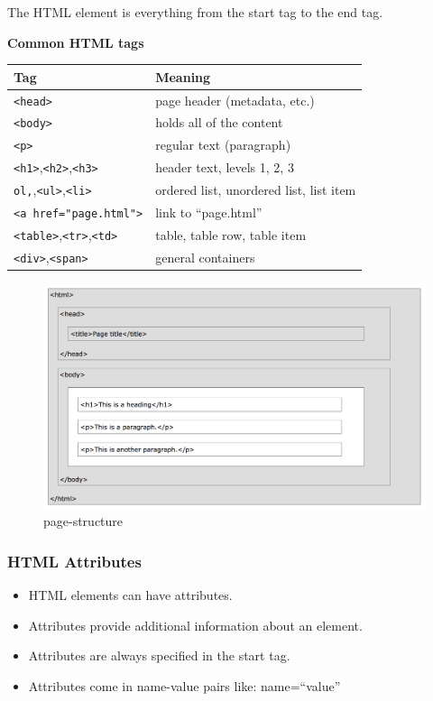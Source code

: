 \documentclass[]{book}
\providecommand{\tightlist}{%
  \setlength{\itemsep}{0pt}\setlength{\parskip}{0pt}}
\begin{document}
The HTML element is everything from the start tag to the end tag.

\textbf{Common HTML tags}

\begin{longtable}[]{@{}ll@{}}
\toprule
Tag & Meaning\tabularnewline
\midrule
\endhead
\texttt{\textless{}head\textgreater{}} & page header (metadata,
etc.)\tabularnewline
\texttt{\textless{}body\textgreater{}} & holds all of the
content\tabularnewline
\texttt{\textless{}p\textgreater{}} & regular text
(paragraph)\tabularnewline
\texttt{\textless{}h1\textgreater{}},\texttt{\textless{}h2\textgreater{}},\texttt{\textless{}h3\textgreater{}}
& header text, levels 1, 2, 3\tabularnewline
\texttt{ol,},\texttt{\textless{}ul\textgreater{}},\texttt{\textless{}li\textgreater{}}
& ordered list, unordered list, list item\tabularnewline
\texttt{\textless{}a\ href="page.html"\textgreater{}} & link to
``page.html''\tabularnewline
\texttt{\textless{}table\textgreater{}},\texttt{\textless{}tr\textgreater{}},\texttt{\textless{}td\textgreater{}}
& table, table row, table item\tabularnewline
\texttt{\textless{}div\textgreater{}},\texttt{\textless{}span\textgreater{}}
& general containers\tabularnewline
\bottomrule
\end{longtable}

\begin{figure}
\centering
\includegraphics{img/page-structure.png}
\caption{page-structure}
\end{figure}

\subsubsection{HTML Attributes}\label{html-attributes}

\begin{itemize}
\tightlist
\item
  HTML elements can have attributes.
\item
  Attributes provide additional information about an element.
\item
  Attributes are always specified in the start tag.
\item
  Attributes come in name-value pairs like: name=``value''
\end{itemize}
\end{document}
